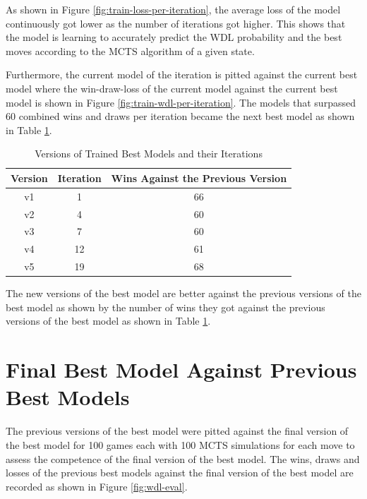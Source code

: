 As shown in Figure \ref{fig:train-loss-per-iteration}, the average loss of the model continuously got lower as the number of iterations got higher. This shows that the model is learning to accurately predict the WDL probability and the best moves according to the MCTS algorithm of a given state.

Furthermore, the current model of the iteration is pitted against the current best model where the win-draw-loss of the current model against the current best model is shown in Figure \ref{fig:train-wdl-per-iteration}. The models that surpassed 60 combined wins and draws per iteration became the next best model as shown in Table \ref{tab:train-best-models-version-per-iteration}.

\begin{table}[H]
    \centering
    \begin{tabular}{ccc}
        \hline
        Version & Iteration & Wins Against the Previous Version \\ \hline
        v1      & 1         & 66                                \\
        v2      & 4         & 60                                \\
        v3      & 7         & 60                                \\
        v4      & 12        & 61                                \\
        v5      & 19        & 68                                \\ \hline
    \end{tabular}
    \caption{Versions of Trained Best Models and their Iterations}
    \label{tab:train-best-models-version-per-iteration}
\end{table}

The new versions of the best model are better against the previous versions of the best model as shown by the number of wins they got against the previous versions of the best model as shown in Table \ref{tab:train-best-models-version-per-iteration}.

\section{Final Best Model Against Previous Best Models}

The previous versions of the best model were pitted against the final version of the best model for 100 games each with 100 MCTS simulations for each move to assess the competence of the final version of the best model. The wins, draws and losses of the previous best models against the final version of the best model are recorded as shown in Figure \ref{fig:wdl-eval}.

